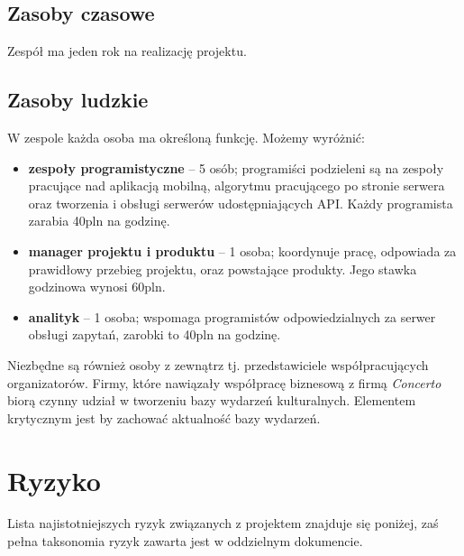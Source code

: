 \documentclass[10pt]{dokument-ppi}
\begin{document}
\subsection{Zasoby czasowe}
Zespół ma jeden rok na realizację projektu.

\subsection{Zasoby ludzkie}
W zespole każda osoba ma określoną funkcję. Możemy wyróżnić:
\begin{itemize}
    \item \textbf{zespoły programistyczne} -- 5 osób; programiści podzieleni są
        na zespoły pracujące nad aplikacją mobilną, algorytmu pracującego po
        stronie serwera oraz tworzenia i obsługi serwerów udostępniających API.
        Każdy programista zarabia 40pln na godzinę.
    \item \textbf{manager projektu i produktu} -- 1 osoba; koordynuje pracę,
        odpowiada za prawidłowy przebieg projektu, oraz powstające produkty.
        Jego stawka godzinowa wynosi 60pln.
    \item \textbf{analityk} -- 1 osoba; wspomaga programistów odpowiedzialnych za serwer
        obsługi zapytań, zarobki to 40pln na godzinę.
\end{itemize}
Niezbędne są również osoby z zewnątrz tj. przedstawiciele współpracujących
organizatorów. Firmy, które nawiązały współpracę biznesową z firmą
\emph{Concerto} biorą czynny udział w tworzeniu bazy wydarzeń kulturalnych.
Elementem krytycznym jest by zachować aktualność bazy wydarzeń.


\section{Ryzyko}
Lista najistotniejszych ryzyk związanych z projektem znajduje się poniżej, zaś
pełna taksonomia ryzyk zawarta jest w oddzielnym dokumencie.
\end{document}
